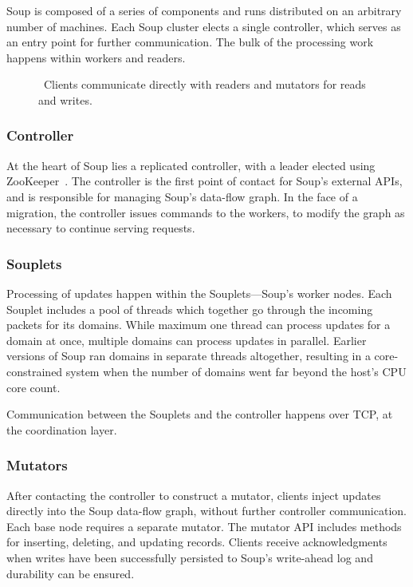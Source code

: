 Soup is composed of a series of components and runs distributed on an arbitrary
number of machines. Each Soup cluster elects a single controller, which serves
as an entry point for further communication. The bulk of the processing work
happens within workers and readers.

\begin{figure}[H]
  \centering
  
  \caption{\
    Clients communicate directly with readers and mutators for reads and writes.
  }\label{fig:architecture}
\end{figure}

\subsubsection{Controller}

At the heart of Soup lies a replicated controller, with a leader elected using
ZooKeeper~\cite{zookeeper}. The controller is the first point of contact for
Soup's external APIs, and is responsible for managing Soup's data-flow graph. In
the face of a migration, the controller issues commands to the workers, to
modify the graph as necessary to continue serving requests.

\subsubsection{Souplets}

Processing of updates happen within the Souplets---Soup's worker nodes. Each
Souplet includes a pool of threads which together go through the incoming
packets for its domains. While maximum one thread can process updates for a
domain at once, multiple domains can process updates in parallel. Earlier
versions of Soup ran domains in separate threads altogether, resulting in a
core-constrained system when the number of domains went far beyond the host's
CPU core count.

Communication between the Souplets and the controller happens over TCP, at the
coordination layer.

\subsubsection{Mutators}

After contacting the controller to construct a mutator, clients inject updates
directly into the Soup data-flow graph, without further controller
communication. Each base node requires a separate mutator. The mutator API
includes methods for inserting, deleting, and updating records. Clients receive
acknowledgments when writes have been successfully persisted to Soup's
write-ahead log and durability can be ensured.

